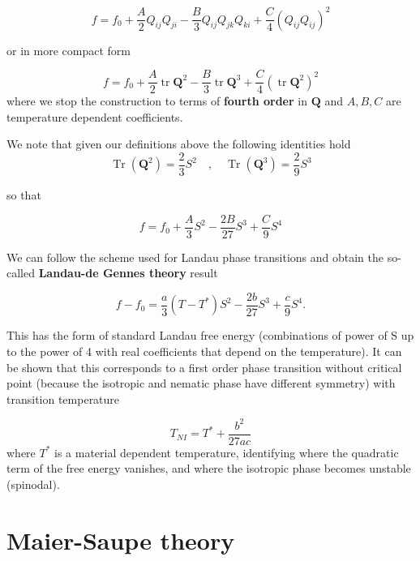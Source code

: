 \documentclass[
  letterpaper,
  enabledeprecatedfontcommands]{report}
\begin{document}
\[
f=f_0+\frac{A}{2} Q_{i j} Q_{j i}-\frac{B}{3} Q_{i j} Q_{j k} Q_{k i}+\frac{C}{4}\left(Q_{i j} Q_{i j}\right)^2
\]

or in more compact form

\[
f=f_0+\frac{A}{2} \operatorname{tr} \mathbf{Q}^2-\frac{B}{3} \operatorname{tr} \mathbf{Q}^3+\frac{C}{4}\left(\operatorname{tr} \mathbf{Q}^2\right)^2
\] where we stop the construction to terms of \textbf{fourth order} in
\(\mathbf{Q}\) and \(A,B,C\) are temperature dependent coefficients.

We note that given our definitions above the following identities hold
\[
\operatorname{Tr}\left(\mathbf{Q}^2\right)=\frac{2}{3} S^2 \quad,\quad
\operatorname{Tr}\left(\mathbf{Q}^3\right)=\frac{2}{9} S^3
\]

so that

\[
f=f_0+\frac{A}{3}S^2-\frac{2B}{27}S^3+\frac{C}{9}S^4
\]


We can follow the scheme used for Landau phase transitions and obtain
the so-called \textbf{Landau-de Gennes theory} result

\[
f-f_0=\frac{a}{3}\left(T-T^{\ast}\right) S^2-\frac{2 b}{27} S^3+\frac{c}{9} S^4 .
\]

This has the form of standard Landau free energy (combinations of power
of S up to the power of 4 with real coefficients that depend on the
temperature). It can be shown that this corresponds to a first order
phase transition without critical point (because the isotropic and
nematic phase have different symmetry) with transition temperature

\[
T_{N I}=T^{\ast}+\frac{b^2}{27 a c}
\] where \(T^{\ast}\) is a material dependent temperature, identifying
where the quadratic term of the free energy vanishes, and where the
isotropic phase becomes unstable (spinodal).

\section{Maier-Saupe theory}\label{maier-saupe-theory}
\end{document}
